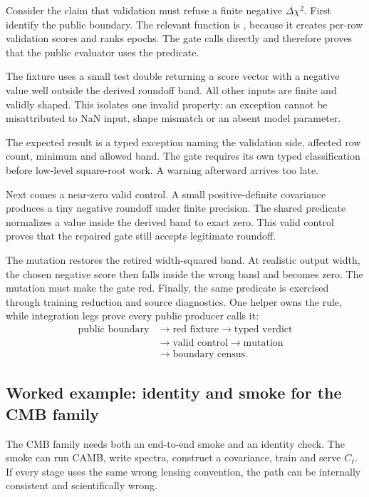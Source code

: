 Consider the claim that validation must refuse a finite negative
\(\Delta\chi^2\).  First identify the public boundary.  The relevant function
is , because it creates per-row validation scores and ranks
epochs.  The gate calls  directly and therefore proves that
the public evaluator uses the predicate.

The fixture uses a small test double returning a score vector with a negative
value well outside the derived roundoff band.  All other inputs are finite and
validly shaped.  This isolates one invalid property: an exception cannot be
misattributed to NaN input, shape mismatch or an absent model parameter.

The expected result is a typed exception naming the validation side, affected
row count, minimum and allowed band.  The gate requires its own typed
classification before low-level square-root work.  A warning afterward
arrives too late.

Next comes a near-zero valid control.  A small positive-definite covariance
produces a tiny negative roundoff under finite precision.  The shared
predicate normalizes a value inside the derived band to exact zero.  This
valid control proves that the repaired gate still accepts legitimate
roundoff.

The mutation restores the retired width-squared band.  At realistic output
width, the chosen negative score then falls inside the wrong band and becomes
zero.  The mutation must make the gate red.  Finally, the same predicate is
exercised through training reduction and source diagnostics.  One helper owns
the rule, while integration legs prove every public producer calls it:
\begin{align*}
\text{public boundary}&\rightarrow\text{red fixture}
\rightarrow\text{typed verdict}\\
&\rightarrow\text{valid control}
\rightarrow\text{mutation}\\
&\rightarrow\text{boundary census}.
\end{align*}

\subsection{Worked example: identity and smoke for the CMB family}

The CMB family needs both an end-to-end smoke and an identity check.  The smoke can run
CAMB, write spectra, construct a covariance, train and serve \(C_\ell\).
If every stage uses the same wrong lensing convention, the path can be
internally consistent and scientifically wrong.

